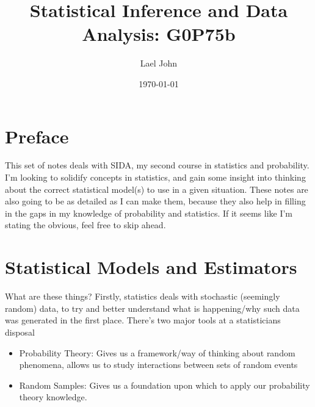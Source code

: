 \documentclass[12pt]{book}
\date{\today}
\title{Statistical Inference and Data Analysis: G0P75b}
\author{Lael John}
\theoremstyle{definition}
\begin{document}
\maketitle
\chapter*{Preface}
This set of notes deals with SIDA, my second course in statistics and probability. I'm looking to solidify concepts in statistics, and gain some insight into thinking about the correct statistical model(s) to use in a given situation. These notes are also going to be as detailed as I can make them, because they also help in filling in the gaps in my knowledge of probability and statistics. If it seems like I'm stating the obvious, feel free to skip ahead.
\tableofcontents
\chapter{Statistical Models and Estimators}
What are these things? Firstly, statistics deals with stochastic (seemingly random) data, to try and better understand what is happening/why such data was generated in the first place. There's two major tools at a statisticians disposal \begin{itemize}
    \item Probability Theory: Gives us a framework/way of thinking about random phenomena, allows us to study interactions between sets of random events
    \item Random Samples: Gives us a foundation upon which to apply our probability theory knowledge.
\end{itemize}
\end{document}
